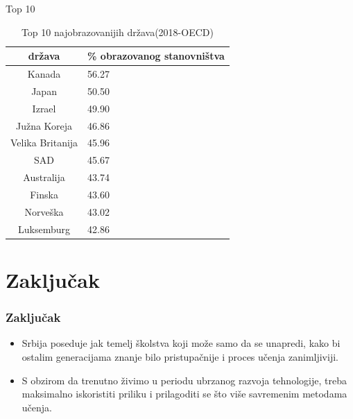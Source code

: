 \documentclass{beamer}
\begin{document}
\begin{frame}{Top 10}
\begin{table}[h!]
\begin{center}
\caption{Top 10 najobrazovanijih država(2018-OECD)}
\begin{tabular}{|c|l|} \hline
\textbf{država}& \textbf{\% obrazovanog stanovništva}\\ \hline
Kanada &56.27\\ \hline
Japan &50.50\\ \hline
Izrael &49.90\\ \hline
Južna Koreja &46.86\\ \hline
Velika Britanija &45.96\\ \hline
SAD &45.67\\ \hline
Australija &43.74\\ \hline
Finska &43.60\\ \hline
Norveška &43.02\\ \hline
Luksemburg &42.86\\ \hline
\end{tabular}
\label{tab:tabela1}
\end{center}
\end{table}
\end{frame}

\section{Zaključak}

\begin{frame}[fragile]\frametitle{Zaključak}
	\begin{itemize}
	    \item Srbija poseduje jak temelj školstva koji može samo da se unapredi, kako bi ostalim generacijama znanje bilo pristupačnije i proces učenja zanimljiviji.
        \item S obzirom da trenutno živimo u periodu ubrzanog razvoja tehnologije, treba maksimalno iskoristiti priliku i prilagoditi se što više savremenim metodama učenja.
	\end{itemize}
\end{frame}
\end{document}
